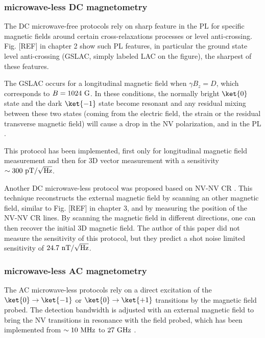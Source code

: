 \documentclass[a4paper,11pt]{report}
\begin{document}
\subsubsection{microwave-less DC magnetometry}
The DC microwave-free protocols rely on sharp feature in the PL for specific magnetic fields around certain cross-relaxations processes or level anti-crossing. Fig. [REF] in chapter 2 show such PL features, in particular the ground state level anti-crossing (GSLAC, simply labeled LAC on the figure), the sharpest of these features.

The GSLAC occurs for a longitudinal magnetic field when $\gamma B_z = D$, which corresponds to $B=1024\ \rm G$. In these conditions, the normally bright $\ket{0}$ state and the dark $\ket{-1}$ state become resonant and any residual mixing between these two states (coming from the electric field, the strain or the residual transverse magnetic field) will cause a drop in the NV polarization, and in the PL \citep{broadway2016anticrossing}. 

This protocol has been implemented, first only for longitudinal magnetic field measurement \citep{wickenbrock2016microwave} and then for 3D vector measurement \citep{zheng2020microwave} with a sensitivity $\sim 300\ \rm pT/\sqrt{\rm Hz}$.

Another DC microwave-less protocol was proposed based on NV-NV CR \citep{akhmedzhanov2017microwave, akhmedzhanov2019magnetometry}. This technique reconstructs the external magnetic field by scanning an other magnetic field, similar to Fig. [REF] in chapter 3, and by measuring the position of the NV-NV CR lines. By scanning the magnetic field in different directions, one can then recover the initial 3D magnetic field. The author of this paper did not measure the sensitivity of this protocol, but they predict a shot noise limited sensitivity of $24.7\ \rm nT/\sqrt{\rm Hz}$.

\subsubsection{microwave-less AC magnetometry}
The AC microwave-less protocols rely on a direct excitation of the $\ket{0} \to \ket{-1}$ or $\ket{0} \to \ket{+1}$ transitions by the magnetic field probed. The detection bandwidth is adjusted with an external magnetic field to bring the NV transitions in resonance with the field probed, which has been implemented from $\sim 10\ \rm MHz$ to $27\ \rm GHz$ \citep{magaletti2022quantum}.
\end{document}
